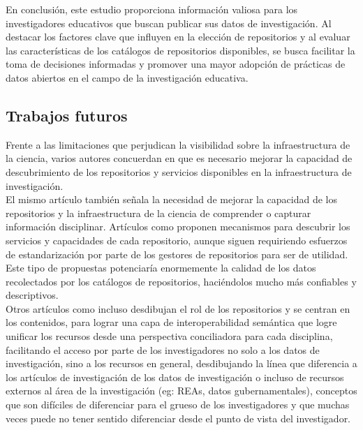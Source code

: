 \documentclass[runningheads]{llncs}
\begin{document}
En conclusión, este estudio proporciona información valiosa para los investigadores educativos que buscan publicar sus datos de investigación. Al destacar los factores clave que influyen en la elección de repositorios y al evaluar las características de los catálogos de repositorios disponibles, se busca facilitar la toma de decisiones informadas y promover una mayor adopción de prácticas de datos abiertos en el campo de la investigación educativa.\\

\subsection*{Trabajos futuros}

Frente a las limitaciones que perjudican la visibilidad sobre la infraestructura de la ciencia, varios autores concuerdan en que es necesario mejorar la capacidad de descubrimiento de los repositorios y servicios disponibles en la infraestructura de investigación. \citep{Huber2024FAIR}\\

El mismo artículo también señala la necesidad de mejorar la capacidad de los repositorios y la infraestructura de la ciencia de comprender o capturar información disciplinar. Artículos como \citet{ulrich_2024_10847707} proponen mecanismos para descubrir los servicios y capacidades de cada repositorio, aunque siguen requiriendo esfuerzos de estandarización por parte de los gestores de repositorios para ser de utilidad. Este tipo de propuestas potenciaría enormemente la calidad de los datos recolectados por los catálogos de repositorios, haciéndolos mucho más confiables y descriptivos.\\

Otros artículos como \citet{Vogt_2025} incluso desdibujan el rol de los repositorios y se centran en los contenidos, para lograr una capa de interoperabilidad semántica que logre unificar los recursos desde una perspectiva conciliadora para cada disciplina, facilitando el  acceso por parte de los investigadores no solo a los datos de investigación, sino a los recursos en general, desdibujando la línea que diferencia a los artículos de investigación de los datos de investigación o incluso de recursos externos al área de la investigación (eg: REAs, datos gubernamentales), conceptos que son difíciles de diferenciar para el grueso de los investigadores y que muchas veces puede no tener sentido diferenciar desde el punto de vista del investigador.\\
\end{document}
